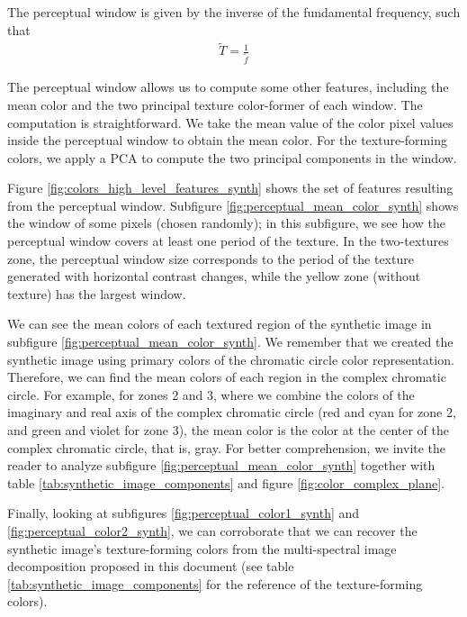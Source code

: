 The perceptual window is given by the inverse of the fundamental frequency, such that
\begin{gather}
    \widetilde{T} = \frac{1}{\widetilde{f}} \label{eq:perceptual_window}
\end{gather}

The perceptual window allows us to compute some other features, including the mean color and the two principal texture color-former of each window. The computation is straightforward. We take the mean value of the color pixel values inside the perceptual window to obtain the mean color. For the texture-forming colors, we apply a PCA to compute the two principal components in the window.

Figure \ref{fig:colors_high_level_features_synth} shows the set of features resulting from the perceptual window. Subfigure \ref{fig:perceptual_mean_color_synth} shows the window of some pixels (chosen randomly); in this subfigure, we see how the perceptual window covers at least one period of the texture. In the two-textures zone, the perceptual window size corresponds to the period of the texture generated with horizontal contrast changes, while the yellow zone (without texture) has the largest window. 

We can see the mean colors of each textured region of the synthetic image in subfigure \ref{fig:perceptual_mean_color_synth}. We remember that we created the synthetic image using primary colors of the chromatic circle color representation. Therefore, we can find the mean colors of each region in the complex chromatic circle. For example, for zones 2 and 3, where we combine the colors of the imaginary and real axis of the complex chromatic circle (red and cyan for zone 2, and green and violet for zone 3), the mean color is the color at the center of the complex chromatic circle, that is, gray. For better comprehension, we invite the reader to analyze subfigure \ref{fig:perceptual_mean_color_synth} together with table \ref{tab:synthetic_image_components} and figure \ref{fig:color_complex_plane}.

Finally, looking at subfigures \ref{fig:perceptual_color1_synth} and \ref{fig:perceptual_color2_synth}, we can corroborate that we can recover the synthetic image's texture-forming colors from the multi-spectral image decomposition proposed in this document (see table \ref{tab:synthetic_image_components} for the reference of the texture-forming colors).

